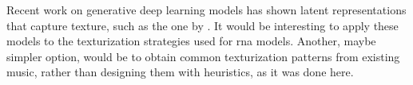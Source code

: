 
Recent work on generative deep learning models has shown
latent representations that capture texture, such as the one
by \textcite{wang2020learning}. It would be interesting to
apply these models to the texturization strategies used for
\gls{rna} models. Another, maybe simpler option, would be to
obtain common texturization patterns from existing music,
rather than designing them with heuristics, as it was done
here.
